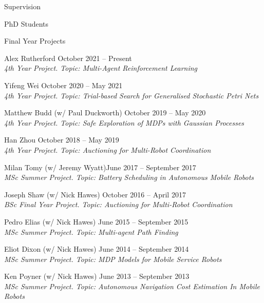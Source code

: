 \begin{rSection}{Supervision}
\begin{rSubsection}{PhD Students}{}{}{}
\end{rSubsection}

\begin{rSubsection}{Final Year Projects}{}{}{}

\item Alex Rutherford  \hfill October 2021 -- Present\\
\textit{4th Year Project. Topic: Multi-Agent Reinforcement Learning}

\item Yifeng Wei  \hfill October 2020 -- May 2021\\
\textit{4th Year Project. Topic: Trial-based Search for Generalised Stochastic Petri Nets}

\item Matthew Budd  (w/ Paul Duckworth)  \hfill October 2019 -- May 2020\\
\textit{4th Year Project. Topic: Safe Exploration of MDPs with Gaussian Processes}

\item Han Zhou \hfill October 2018 -- May 2019\\
\textit{4th Year Project. Topic: Auctioning for Multi-Robot Coordination}

\item   Milan Tomy (w/ Jeremy Wyatt)\hfill June 2017 -- September 2017\\
\textit{MSc Summer Project. Topic: Battery Scheduling in Autonomous Mobile Robots}

\item   Joseph Shaw (w/ Nick Hawes) \hfill October 2016 -- April 2017\\
\textit{BSc Final Year Project. Topic: Auctioning for Multi-Robot Coordination}

\item  Pedro Elias (w/ Nick Hawes)  \hfill June 2015 -- September 2015\\
\textit{MSc Summer Project. Topic: Multi-agent Path Finding}

\item  Eliot Dixon  (w/ Nick Hawes) \hfill June 2014 -- September 2014\\
\textit{MSc Summer Project. Topic: MDP Models for Mobile Service Robots}

\item  Ken Poyner (w/ Nick Hawes) \hfill June 	2013 -- September 2013\\
\textit{MSc Summer Project. Topic: Autonomous Navigation Cost Estimation In Mobile Robots}

\end{rSubsection}

\end{rSection}

